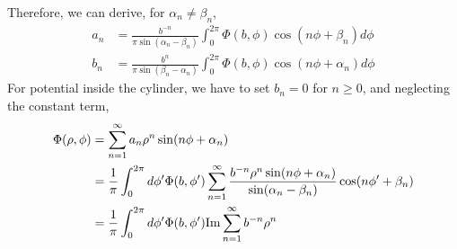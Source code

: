 \documentclass[12pt]{article}
\begin{document}
Therefore, we can derive, for $\alpha_n \neq \beta_n$,
\begin{align}
    a_n &= \frac{b^{-n} }{\pi \sin(\alpha_n - \beta_n)} \int_0^{2\pi} \Phi(b, \phi) \cos(n \phi + \beta_n) d\phi\\
    b_n &= \frac{b^n}{\pi \sin(\beta_n - \alpha_n)} \int_0^{2\pi} \Phi(b, \phi)\cos(n \phi + \alpha_n) d\phi
\end{align}
For potential inside the cylinder, we have to set $b_n = 0$ for $n \ge 0$, and neglecting the constant term,
\begin{align}
    \Phi(\rho, \phi) &= \sum_{n=1}^\infty a_n \rho^n \sin(n \phi + \alpha_n)\\
    &= \frac1\pi\int_{0}^{2\pi} d\phi' \Phi(b, \phi') \sum_{n=1}^\infty \frac{b^{-n} \rho^n \sin(n \phi + \alpha_n)}{\sin(\alpha_n - \beta_n)}  \cos(n \phi'+ \beta_n) \cr
    & = \frac{1}{\pi} \int_0^{2\pi} d \phi' \Phi(b, \phi'){\rm Im} \sum_{n=1}^\infty b^{-n}\rho^n
\end{align}
\end{document}
